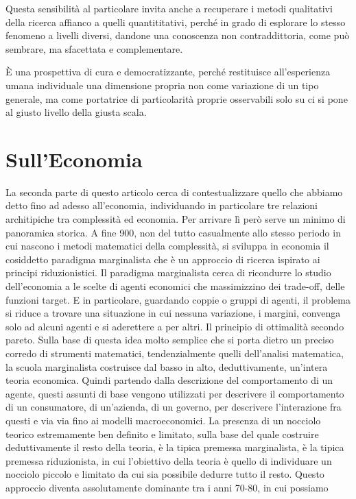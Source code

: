 \documentclass[a4paper, headings=standardclasses]{scrartcl}
\begin{document}
Questa sensibilità al particolare invita anche a recuperare i metodi qualitativi della ricerca affianco a quelli quantititativi, perché in grado di esplorare lo stesso fenomeno a livelli diversi, dandone una conoscenza non contraddittoria, come può sembrare, ma sfacettata e complementare.

È una prospettiva di cura e democratizzante, perché restituisce all'esperienza umana individuale una dimensione propria non come variazione di un tipo generale, ma come portatrice di particolarità proprie osservabili solo su ci si pone al giusto livello della giusta scala.


\section{Sull'Economia}
La seconda parte di questo articolo cerca di contestualizzare quello che abbiamo detto
fino ad adesso all'economia, individuando in particolare tre relazioni architipiche
tra complessità ed economia. Per arrivare lì però serve un minimo di panoramica storica.
A fine 900, non del tutto casualmente allo stesso periodo in cui nascono i metodi matematici
della complessità, si sviluppa in economia il cosiddetto paradigma marginalista che è
un approccio di ricerca ispirato ai principi riduzionistici. Il paradigma marginalista
cerca di ricondurre lo studio dell'economia a le scelte di agenti economici che massimizzino
dei trade-off, delle funzioni target. E in particolare, guardando coppie o gruppi di agenti,
il problema si riduce a trovare una situazione in cui nessuna variazione, i margini, convenga
solo ad alcuni agenti e si aderettere a per altri. Il principio di ottimalità secondo pareto.
Sulla base di questa idea molto semplice che si porta dietro un preciso corredo di strumenti
matematici, tendenzialmente quelli dell'analisi matematica, la scuola marginalista costruisce
dal basso in alto, deduttivamente, un'intera teoria economica. Quindi partendo dalla descrizione
del comportamento di un agente, questi assunti di base vengono utilizzati per descrivere il
comportamento di un consumatore, di un'azienda, di un governo, per descrivere l'interazione fra
questi e via via fino ai modelli macroeconomici. La presenza di un nocciolo teorico estremamente
ben definito e limitato, sulla base del quale costruire deduttivamente il resto della teoria,
è la tipica premessa marginalista, è la tipica premessa riduzionista, in cui l'obiettivo della
teoria è quello di individuare un nocciolo piccolo e limitato da cui sia possibile dedurre tutto il
resto. Questo approccio diventa assolutamente dominante tra i anni 70-80, in cui possiamo
\end{document}
